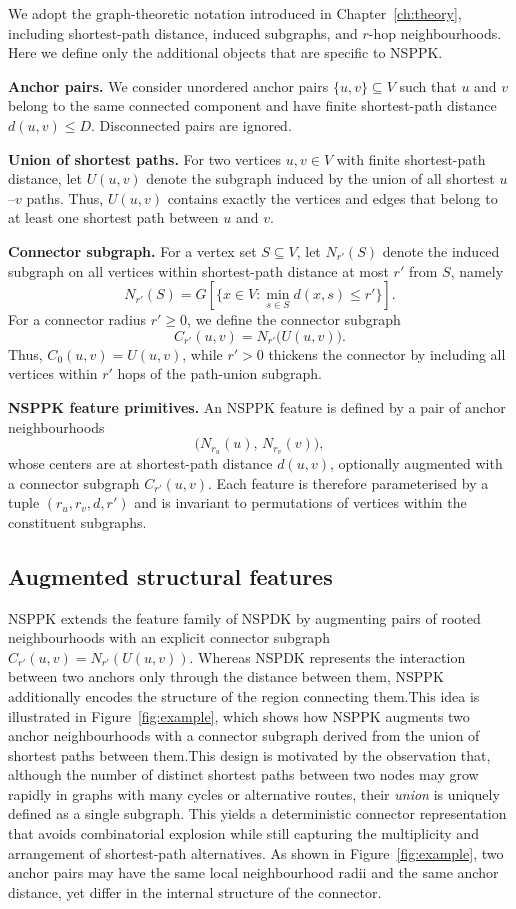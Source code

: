 We adopt the graph-theoretic notation introduced in
Chapter~\ref{ch:theory}, including shortest-path distance, induced subgraphs,
and $r$-hop neighbourhoods. Here we define only the additional objects that are
specific to NSPPK.

\textbf{Anchor pairs.}
We consider unordered anchor pairs $\{u,v\}\subseteq V$ such that $u$ and $v$
belong to the same connected component and have finite shortest-path distance
$d(u,v)\leq D$. Disconnected pairs are ignored.


\textbf{Union of shortest paths.}
For two vertices $u,v\in V$ with finite shortest-path distance, let $U(u,v)$
denote the subgraph induced by the union of all shortest $u$--$v$ paths.
Thus, $U(u,v)$ contains exactly the vertices and edges that belong to at least
one shortest path between $u$ and $v$.

\textbf{Connector subgraph.}
For a vertex set $S\subseteq V$, let $N_{r'}(S)$ denote the induced subgraph on
all vertices within shortest-path distance at most $r'$ from $S$, namely
\[
N_{r'}(S)
=
G\!\left[\{x\in V : \min_{s\in S} d(x,s)\le r'\}\right].
\]
For a connector radius $r'\ge 0$, we define the connector subgraph
\[
C_{r'}(u,v)
=
N_{r'}\!\big(U(u,v)\big).
\]
Thus, $C_0(u,v)=U(u,v)$, while $r'>0$ thickens the connector by including all
vertices within $r'$ hops of the path-union subgraph.

\textbf{NSPPK feature primitives.}
An NSPPK feature is defined by a pair of anchor neighbourhoods
\[
\bigl(N_{r_u}(u),\,N_{r_v}(v)\bigr),
\]
whose centers are at shortest-path distance $d(u,v)$, optionally augmented with
a connector subgraph $C_{r'}(u,v)$. Each feature is therefore parameterised by
a tuple $(r_u,r_v,d,r')$ and is invariant to permutations of vertices within
the constituent subgraphs.

\subsection{Augmented structural features}

NSPPK extends the feature family of NSPDK by augmenting pairs of rooted
neighbourhoods with an explicit connector subgraph
$C_{r'}(u,v)=N_{r'}(U(u,v))$. Whereas NSPDK represents the interaction between
two anchors only through the distance between them, NSPPK additionally encodes
the structure of the region connecting them.This idea is illustrated in Figure~\ref{fig:example}, which shows how NSPPK
augments two anchor neighbourhoods with a connector subgraph derived from the
union of shortest paths between them.This design is motivated by the observation that, although the number of
distinct shortest paths between two nodes may grow rapidly in graphs with many
cycles or alternative routes, their \emph{union} is uniquely defined as a
single subgraph. This yields a deterministic connector representation that
avoids combinatorial explosion while still capturing the multiplicity and
arrangement of shortest-path alternatives. As shown in Figure~\ref{fig:example}, two anchor pairs may have the same local
neighbourhood radii and the same anchor distance, yet differ in the internal
structure of the connector.

